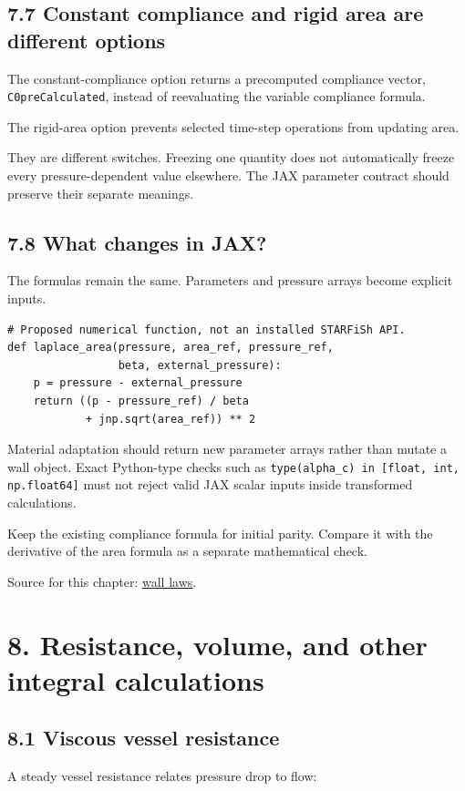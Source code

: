 \documentclass[11pt,a4paper]{article}
\begin{document}
\subsection{7.7 Constant compliance and rigid area are different options}
The constant-compliance option returns a precomputed compliance vector, \texttt{C0preCalculated}, instead of reevaluating the variable compliance formula.

The rigid-area option prevents selected time-step operations from updating area.

They are different switches. Freezing one quantity does not automatically freeze every pressure-dependent value elsewhere. The JAX parameter contract should preserve their separate meanings.

\subsection{7.8 What changes in JAX?}
The formulas remain the same. Parameters and pressure arrays become explicit inputs.


\begin{lstlisting}
# Proposed numerical function, not an installed STARFiSh API.
def laplace_area(pressure, area_ref, pressure_ref,
                 beta, external_pressure):
    p = pressure - external_pressure
    return ((p - pressure_ref) / beta
            + jnp.sqrt(area_ref)) ** 2
\end{lstlisting}
Material adaptation should return new parameter arrays rather than mutate a wall object. Exact Python-type checks such as \texttt{type(alpha\_\allowbreak{}c) in [float, int, np.\allowbreak{}float64]} must not reject valid JAX scalar inputs inside transformed calculations.

Keep the existing compliance formula for initial parity. Compare it with the derivative of the area formula as a separate mathematical check.

Source for this chapter: \href{/home/sadid/starfish/NetworkLib/classCompliance.py}{wall laws}.

\clearpage
\section{8. Resistance, volume, and other integral calculations}
\subsection{8.1 Viscous vessel resistance}
A steady vessel resistance relates pressure drop to flow:
\end{document}
